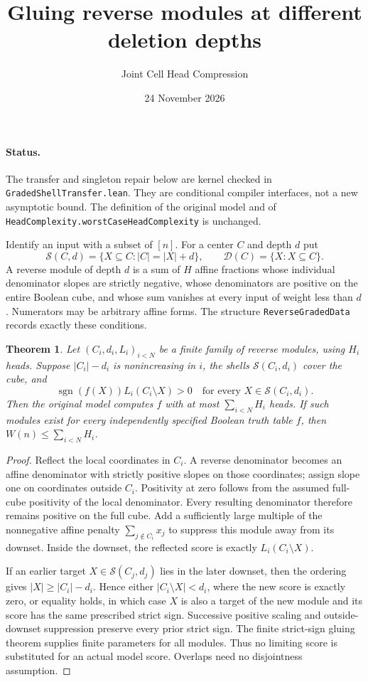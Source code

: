 \documentclass[11pt]{article}
\title{Gluing reverse modules at different deletion depths}
\author{Joint Cell Head Compression}
\date{24 November 2026}
\newtheorem{theorem}{Theorem}
\begin{document}
\maketitle

\paragraph{Status.}
The transfer and singleton repair below are kernel checked in
\texttt{GradedShellTransfer.lean}. They are conditional compiler interfaces,
not a new asymptotic bound. The definition of the original model and of
\texttt{HeadComplexity.worstCaseHeadComplexity} is unchanged.

Identify an input with a subset of $[n]$. For a center $C$ and depth $d$ put
\[
 \mathcal S(C,d)=\{X\subseteq C:|C|=|X|+d\},
 \qquad \mathcal D(C)=\{X:X\subseteq C\}.
\]
A reverse module of depth $d$ is a sum of $H$ affine fractions whose
individual denominator slopes are strictly negative, whose denominators
are positive on the entire Boolean cube, and whose sum vanishes at every
input of weight less than $d$. Numerators may be arbitrary affine forms.
The structure \texttt{ReverseGradedData} records exactly these conditions.

\begin{theorem}
Let $(C_i,d_i,L_i)_{i<N}$ be a finite family of reverse modules, using
$H_i$ heads. Suppose $|C_i|-d_i$ is nonincreasing in $i$, the shells
$\mathcal S(C_i,d_i)$ cover the cube, and
\[
 \operatorname{sgn}(f(X))L_i(C_i\setminus X)>0
 \quad\text{for every }X\in\mathcal S(C_i,d_i).
\]
Then the original model computes $f$ with at most $\sum_{i<N}H_i$ heads.
If such modules exist for every independently specified Boolean truth
table $f$, then $W(n)\leq\sum_{i<N}H_i$.
\end{theorem}
\begin{proof}
Reflect the local coordinates in $C_i$. A reverse denominator becomes
an affine denominator with strictly positive slopes on those coordinates;
assign slope one on coordinates outside $C_i$. Positivity at zero follows
from the assumed full-cube positivity of the local denominator. Every
resulting denominator therefore remains positive on the full cube. Add a
sufficiently large multiple of the nonnegative affine penalty
$\sum_{j\notin C_i}x_j$ to suppress this module away from its downset.
Inside the downset, the reflected score is exactly $L_i(C_i\setminus X)$.

If an earlier target $X\in\mathcal S(C_j,d_j)$ lies in the later downset,
then the ordering gives $|X|\geq|C_i|-d_i$. Hence either
$|C_i\setminus X|<d_i$, where the new score is exactly zero, or equality
holds, in which case $X$ is also a target of the new module and its score
has the same prescribed strict sign. Successive positive scaling and
outside-downset suppression preserve every prior strict sign. The finite
strict-sign gluing theorem supplies finite parameters for all modules.
Thus no limiting score is substituted for an actual model score.
Overlaps need no disjointness assumption.
\end{proof}
\end{document}
